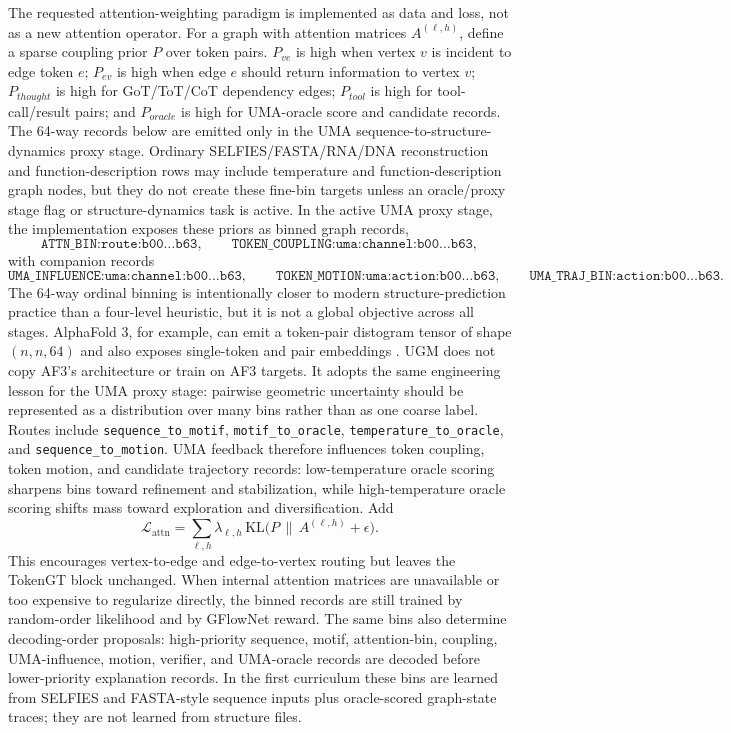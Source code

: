 \documentclass[11pt]{article}
\newcommand{\1}{\mathbf{1}}
\begin{document}
The requested attention-weighting paradigm is implemented as data and loss, not as a new attention operator. For a graph with attention matrices $A^{(\ell,h)}$, define a sparse coupling prior $P$ over token pairs. $P_{ve}$ is high when vertex $v$ is incident to edge token $e$; $P_{ev}$ is high when edge $e$ should return information to vertex $v$; $P_{thought}$ is high for GoT/ToT/CoT dependency edges; $P_{tool}$ is high for tool-call/result pairs; and $P_{oracle}$ is high for UMA-oracle score and candidate records. The 64-way records below are emitted only in the UMA sequence-to-structure-dynamics proxy stage. Ordinary SELFIES/FASTA/RNA/DNA reconstruction and function-description rows may include temperature and function-description graph nodes, but they do not create these fine-bin targets unless an oracle/proxy stage flag or structure-dynamics task is active. In the active UMA proxy stage, the implementation exposes these priors as binned graph records,
\[
\texttt{ATTN\_BIN:route:b00\ldots b63},\qquad
\texttt{TOKEN\_COUPLING:uma:channel:b00\ldots b63},
\]
with companion records
\[
\texttt{UMA\_INFLUENCE:uma:channel:b00\ldots b63},\qquad
\texttt{TOKEN\_MOTION:uma:action:b00\ldots b63},\qquad
\texttt{UMA\_TRAJ\_BIN:action:b00\ldots b63}.
\]
The 64-way ordinal binning is intentionally closer to modern structure-prediction practice than a four-level heuristic, but it is not a global objective across all stages. AlphaFold 3, for example, can emit a token-pair distogram tensor of shape \((n,n,64)\) and also exposes single-token and pair embeddings \cite{AbramsonAF3_2024,AlphaFold3Output2026}. UGM does not copy AF3's architecture or train on AF3 targets. It adopts the same engineering lesson for the UMA proxy stage: pairwise geometric uncertainty should be represented as a distribution over many bins rather than as one coarse label. Routes include \texttt{sequence\_to\_motif}, \texttt{motif\_to\_oracle}, \texttt{temperature\_to\_oracle}, and \texttt{sequence\_to\_motion}. UMA feedback therefore influences token coupling, token motion, and candidate trajectory records: low-temperature oracle scoring sharpens bins toward refinement and stabilization, while high-temperature oracle scoring shifts mass toward exploration and diversification. Add
\[
  \mathcal L_{\mathrm{attn}} = \sum_{\ell,h}\lambda_{\ell,h}\,\mathrm{KL}\big(P\,\|\,A^{(\ell,h)}+\epsilon\big).
\]
This encourages vertex-to-edge and edge-to-vertex routing but leaves the TokenGT block unchanged. When internal attention matrices are unavailable or too expensive to regularize directly, the binned records are still trained by random-order likelihood and by GFlowNet reward. The same bins also determine decoding-order proposals: high-priority sequence, motif, attention-bin, coupling, UMA-influence, motion, verifier, and UMA-oracle records are decoded before lower-priority explanation records. In the first curriculum these bins are learned from SELFIES and FASTA-style sequence inputs plus oracle-scored graph-state traces; they are not learned from structure files.
\end{document}
